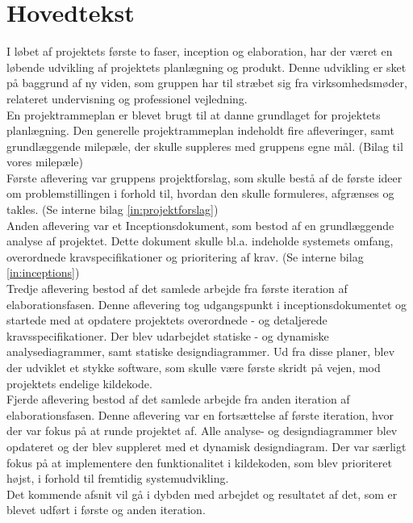 \chapter{Hovedtekst}
I løbet af projektets første to faser, inception og elaboration, har der været en løbende udvikling af projektets planlægning og produkt. Denne udvikling er sket på baggrund af ny viden, som gruppen har til stræbet sig fra virksomhedsmøder, relateret undervisning og professionel vejledning. \\
En projektrammeplan er blevet brugt til at danne grundlaget for projektets planlægning. Den generelle projektrammeplan indeholdt fire afleveringer, samt grundlæggende milepæle, der skulle suppleres med gruppens egne mål. 
(Bilag til vores milepæle) \\
Første aflevering var gruppens projektforslag, som skulle bestå af de første ideer om problemstillingen i forhold til, hvordan den skulle formuleres, afgrænses og takles. (Se interne bilag \ref{in:projektforslag})\\
Anden aflevering var et Inceptionsdokument, som bestod af en grundlæggende analyse af projektet. Dette dokument skulle bl.a. indeholde systemets omfang, overordnede kravspecifikationer og prioritering af krav. (Se interne bilag \ref{in:inceptions})\\
Tredje aflevering bestod af det samlede arbejde fra første iteration af elaborationsfasen. Denne aflevering tog udgangspunkt i inceptionsdokumentet og startede med at opdatere projektets overordnede - og detaljerede kravsspecifikationer. Der blev udarbejdet statiske - og dynamiske analysediagrammer, samt statiske designdiagrammer. Ud fra disse planer, blev der udviklet et stykke software, som skulle være første skridt på vejen, mod projektets endelige kildekode.\\
Fjerde aflevering bestod af det samlede arbejde fra anden iteration af elaborationsfasen. Denne aflevering var en fortsættelse af første iteration, hvor der var fokus på at runde projektet af. Alle analyse- og designdiagrammer blev opdateret og der blev suppleret med et dynamisk designdiagram. Der var særligt fokus på at implementere den funktionalitet i kildekoden, som blev prioriteret højst, i forhold til fremtidig systemudvikling.\\
Det kommende afsnit vil gå i dybden med arbejdet og resultatet af det, som er blevet udført i første og anden iteration.

